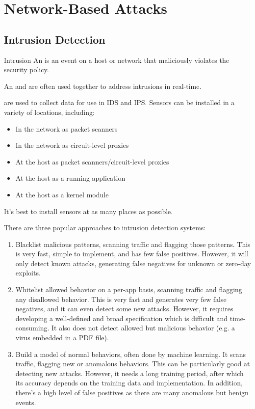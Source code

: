 \chapter{Network-Based Attacks}
\section{Intrusion Detection}

\begin{dfnbox}{Intrusion}{}
    An  is an event on a host or network that maliciously violates the security policy.
\end{dfnbox}

An  and  are often used together to address intrusions in real-time.

 are used to collect data for use in IDS and IPS. Sensors can be installed in a variety of locations, including:
\begin{itemize}[noitemsep]
    \item In the network as packet scanners
    \item In the network as circuit-level proxies
    \item At the host as packet scanners/circuit-level proxies
    \item At the host as a running application
    \item At the host as a kernel module
\end{itemize}
It's best to install sensors at as many places as possible.



There are three popular approaches to intrusion detection systems:
\begin{enumerate}
    \item {} Blacklist malicious patterns, scanning traffic and flagging those patterns. This is very fast, simple to implement, and has few false positives. However, it will only detect known attacks, generating false negatives for unknown or zero-day exploits.
    \item {} Whitelist allowed behavior on a per-app basis, scanning traffic and flagging any disallowed behavior. This is very fast and generates very few false negatives, and it can even detect some new attacks. However, it requires developing a well-defined and broad specification which is difficult and time-consuming. It also does not detect allowed but malicious behavior (e.g. a virus embedded in a PDF file).
    \item {} Build a model of normal behaviors, often done by machine learning. It scans traffic, flagging new or anomalous behaviors. This can be particularly good at detecting new attacks. However, it needs a long training period, after which its accuracy depends on the training data and implementation. In addition, there's a high level of false positives as there are many anomalous but benign events.
\end{enumerate}

